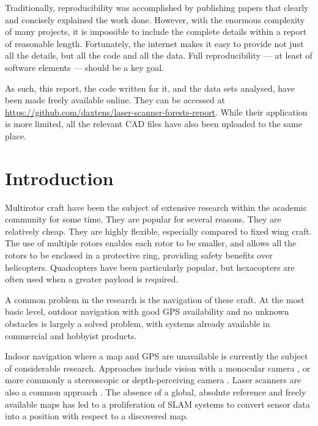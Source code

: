 \documentclass[12pt,oneside,a4paper,draft]{book}
\begin{document}
Traditionally, reproducibility was accomplished by publishing papers
that clearly and concisely explained the work done. However, with the
enormous complexity of many projects, it is impossible to include the
complete details within a report of reasonable length. Fortunately,
the internet makes it easy to provide not just all the details, but
all the code and all the data. Full reproducibility --- at least of
software elements --- should be a key goal.

As such, this report, the code written for it, and the data sets
analysed, have been made freely available online. They can be accessed
at \url{https://github.com/daxtens/laser-scanner-forests-report}.
While their application is more limited, all the relevant CAD files
have also been uploaded to the same place.



\chapter{Introduction}
\label{cha:intro}


Multirotor craft have been the subject of extensive research within
the academic community for some time. They are popular for several
reasons. They are relatively cheap. They are highly flexible,
especially compared to fixed wing craft. The use of multiple rotors
enables each rotor to be smaller, and allows all the rotors to be
enclosed in a protective ring, providing safety benefits over
helicopters. Quadcopters have been particularly popular, but
hexacopters are often used when a greater payload is required.

A common problem in the research is the navigation of these craft. At
the most basic level, outdoor navigation with good GPS availability
and no unknown obstacles is largely a solved problem, with systems
already available in commercial and hobbyist products.

Indoor navigation where a map and GPS are unavailable is currently the
subject of considerable research. Approaches include vision with a
monocular camera \cite{5152680}, or more commonly a stereoscopic or
depth-perceiving camera \cite{huang2011visual}. Laser scanners are
also a common approach \cite{achtelik2009stereo}. The absence of a
global, absolute reference and freely available maps has led to a
proliferation of \gls{SLAM} systems to convert sensor data into a
position with respect to a discovered map.
\end{document}
